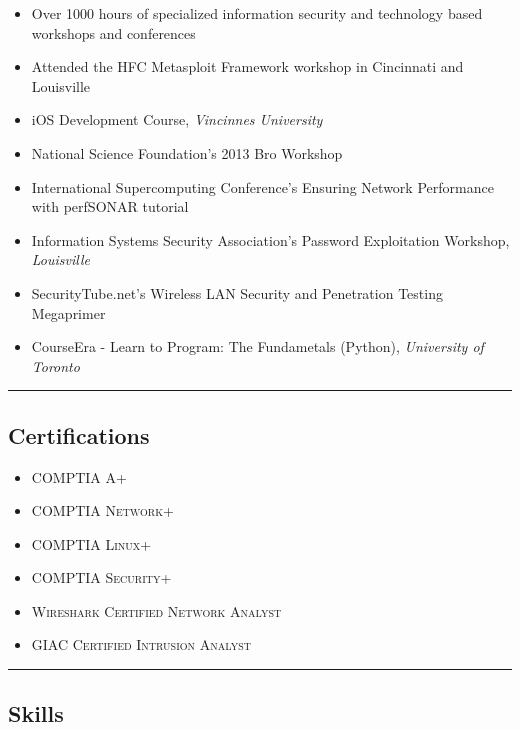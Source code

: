 \documentclass[10pt,letterpaper]{article}
\begin{document}
\begin{itemize}
	\parskip=0.1em

	\item Over 1000 hours of specialized information security and technology based workshops and conferences
	\item Attended the HFC Metasploit Framework workshop in Cincinnati and Louisville
	\item iOS Development Course, \textit{Vincinnes University}
	\item National Science Foundation's 2013 Bro Workshop
	\item International Supercomputing Conference's Ensuring Network Performance with perfSONAR tutorial
	\item Information Systems Security Association's Password Exploitation Workshop, \textit{Louisville}
	\item SecurityTube.net's Wireless LAN Security and Penetration Testing Megaprimer
	\item CourseEra - Learn to Program: The Fundametals (Python), \textit{University of Toronto}
\end{itemize}

\hrule
\vspace{-0.4em}
\subsection*{Certifications}

\begin{itemize}
	\parskip=0.1em

	\item \textsc{COMPTIA A+}
	\item \textsc{COMPTIA Network+}
	\item \textsc{COMPTIA Linux+}
	\item \textsc{COMPTIA Security+}
	\item \textsc{Wireshark Certified Network Analyst}
	\item \textsc{GIAC Certified Intrusion Analyst}
\end{itemize}

\hrule
\vspace{-0.4em}
\subsection*{Skills}
\end{document}
